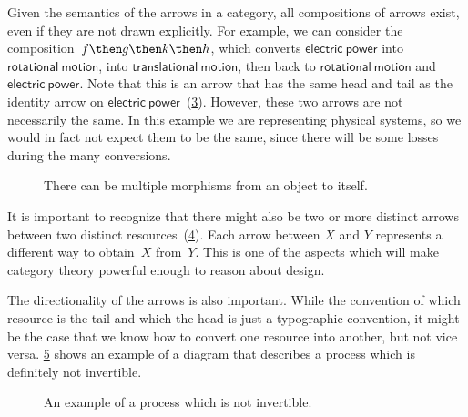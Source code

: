 \begin{figure}[h!]
    \centering
    \caption{\label{fig:e6}}
\end{figure}


\begin{figure}[h!]
    \centering
    \caption{\label{fig:e6-together}}
\end{figure}
Given the semantics of the arrows in a category, all compositions of arrows exist, even if they are not drawn
explicitly. For example, we can consider the composition~$f\then g \then k \then h$, which
converts $\mathsf{electric}\ \mathsf{power}$ into $\mathsf{rotational}\ \mathsf{motion}$, into $\mathsf{translational}\ \mathsf{motion}$, then back to
$\mathsf{rotational}\ \mathsf{motion}$ and $\mathsf{electric}\ \mathsf{power}$. Note that this is an arrow that has the same head and tail as the identity arrow on $\mathsf{electric}\ \mathsf{power}$~(\cref{fig:e8}). However, these two arrows are not necessarily the same. In this example we are representing physical systems, so we would in fact not expect them to be the same, since there will be some losses during the many conversions.

\begin{figure}[h!]
    \centering
    \caption{There can be multiple morphisms from an object to itself.\label{fig:e8}}
\end{figure}

It is important to recognize that there might also be two or more distinct arrows between two distinct resources~(\cref{fig:e9}). Each arrow between $X$ and $Y$ represents a different way  to obtain~$X$ from~$Y$. This is one of the aspects which will make category theory powerful enough to reason about design.

\begin{figure}[h!]
    \centering
    \caption{\label{fig:e9}}
\end{figure}

The directionality of the arrows is also important. While the convention of
which resource is the tail and which the head is just a typographic convention,
it might be the case that we know how to convert one resource into another, but
not vice versa. \cref{fig:e10} shows an example of a diagram that describes a process which is definitely
not invertible.

\begin{figure}[h!]
    \centering
    \caption{An example of a process which is not invertible. \label{fig:e10}}
\end{figure}

